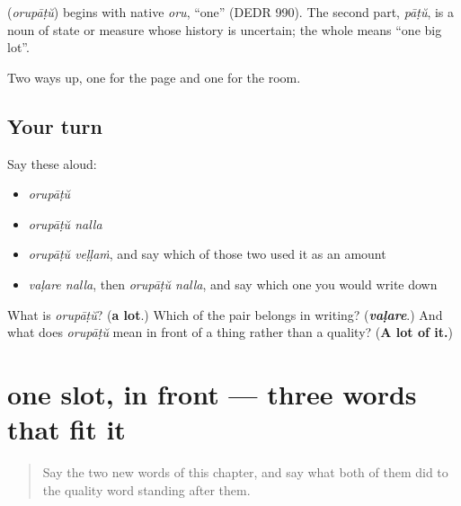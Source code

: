 \begin{cousinweb}
\textbf{} (\emph{orupāṭŭ}) begins with native \emph{oru}, \textquotedblleft{}one\textquotedblright{} (DEDR 990). The second part, \emph{pāṭŭ}, is a noun of state or measure whose history is uncertain; the whole means \textquotedblleft{}one big lot\textquotedblright{}.
\end{cousinweb}

\begin{grammarlens}[title={What you've built}]
Two ways up, one for the page and one for the room.
\end{grammarlens}

\subsection*{Your turn}
Say these aloud:

\begin{itemize}
\raggedright
  \item \emph{orupāṭŭ}
  \item \emph{orupāṭŭ nalla}
  \item \emph{orupāṭŭ veḷḷaṁ}, and say which of those two used it as an amount
  \item \emph{vaḷare nalla}, then \emph{orupāṭŭ nalla}, and say which one you would write down
\end{itemize}

\begin{tcolorbox}[breakable,colback=teal!4,colframe=teal!35!black,title={Before you move on}]
What is \emph{orupāṭŭ}? (\textbf{a lot}.) Which of the pair belongs in writing? (\emph{\textbf{vaḷare}}.) And what does \emph{orupāṭŭ} mean in front of a thing rather than a quality? (\textbf{A lot of it.})
\end{tcolorbox}
\section[one slot, in front]{one slot, in front — three words that fit it}

\label{lesson:ML-C79-degree-slot}



\begin{quote}
Say the two new words of this chapter, and say what both of them did to the quality word standing after them.
\end{quote}

